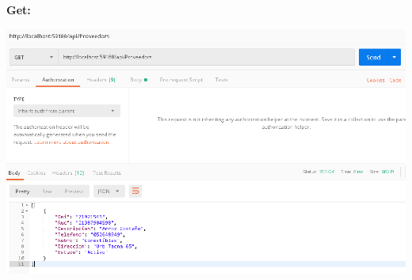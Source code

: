 \begin{flushleft}
\begin{center}
	\end{center}
\textbf{}\\

\textbf{}\\
\textbf{}\\
\textbf{}\\
\textbf{}\\
\textbf{}\\
\textbf{}\\
\textbf{}\\
\textbf{}\\
\textbf{}\\
\textbf{}\\
\textbf{}\\
\textbf{}\\
\textbf{}\\
\textbf{}\\
\textbf{}\\
\textbf{}\\
\textbf{Get:}\\
\begin{center}
	\includegraphics[width=19cm]{./Imagenes/get2} 
	\end{center}
\textbf{}\\
\textbf{}\\
\textbf{}\\
\textbf{}\\
\textbf{}\\
\textbf{}\\
\textbf{}\\
\textbf{}\\
\textbf{}\\
\textbf{}\\
\textbf{}\\
\textbf{}\\
\textbf{}\\

\end{flushleft}
